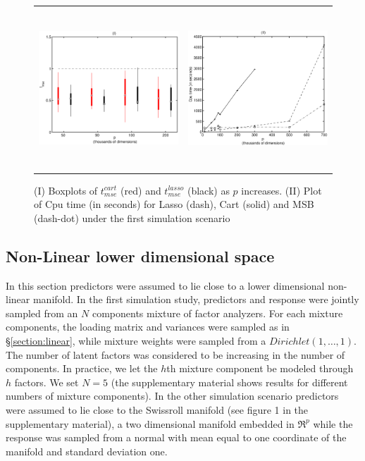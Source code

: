 \documentclass{article} %
\begin{document}
\begin{figure}
\centering
\begin{tabular}{ll}
\includegraphics[width=70mm,height=50mm]{boxplot_exp1.eps} &\includegraphics[width=70mm,height=60mm]{cpuTime_exp1.eps}

\end{tabular}
\caption{(I) Boxplots of $ t^{cart}_{mse}$ (red) and $t^{lasso}_{mse}$ (black) as $p$ increases. (II) Plot of Cpu time (in seconds) for Lasso (dash), Cart (solid) and MSB (dash-dot) under the first simulation scenario} \label{boxplot:linear}

\end{figure}


\subsection{Non-Linear lower dimensional space}

In this section predictors were assumed to lie close to a lower dimensional non-linear manifold. In the first simulation study, predictors and response were jointly sampled from an $N$ components mixture of factor analyzers. For each mixture components, the loading matrix and variances were sampled as in \S \ref{section:linear}, while mixture weights were sampled from a $Dirichlet(1, \dots, 1)$. The number of latent factors was considered to be increasing in the number of components. In practice, we let the $h$th mixture component be modeled through $h$ factors. We set $N=5$ (the supplementary material shows results for different numbers of mixture components). In the other simulation scenario predictors were assumed to lie close to the Swissroll manifold (see figure 1 in the supplementary material), a two dimensional manifold embedded in $\Re^p$ while the response was sampled from a normal with mean equal to one coordinate of the manifold and standard deviation one.
\end{document}
